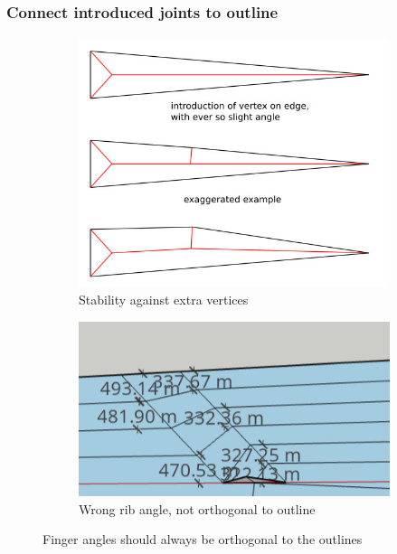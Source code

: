 \subsubsection{Connect introduced joints to outline}
\begin{figure}[H]
\begin{subfigure}{0.45\columnwidth}
\includegraphics[width=\columnwidth]{sources/method/finger_angles.jpg}
\caption{Stability against extra vertices}
\label{finger_angles_stability}
\end{subfigure}
\begin{subfigure}{0.45\columnwidth}
\includegraphics[width=\columnwidth]{sources/method/finger_angles_2.jpg}
\caption{Wrong rib angle, not orthogonal to outline}
\end{subfigure}
\caption{Finger angles should always be orthogonal to the outlines}
\label{finger_angles}
\end{figure}

